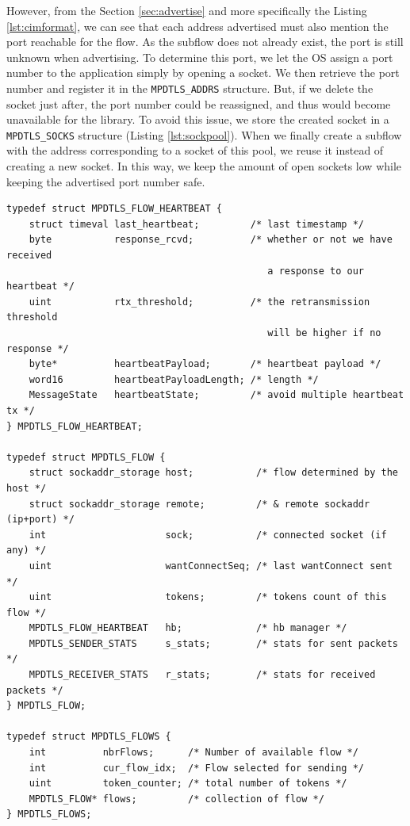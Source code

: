 However, from the Section \ref{sec:advertise} and more specifically the Listing \ref{lst:cimformat}, we can see that each address advertised must also mention the port reachable for the flow. As the subflow does not already exist, the port is still unknown when advertising. To determine this port, we let the OS assign a port number to the application simply by opening a socket. We then retrieve the port number and register it in the \texttt{MPDTLS\_ADDRS} structure. But, if we delete the socket just after, the port number could be reassigned, and thus would become unavailable for the library. To avoid this issue, we store the created socket in a \texttt{MPDTLS\_SOCKS} structure (Listing \ref{lst:sockpool}). When we finally create a subflow with the address corresponding to a socket of this pool, we reuse it instead of creating a new socket. In this way, we keep the amount of open sockets low while keeping the advertised port number safe.

\begin{lstlisting}[caption=Structures handling flows, label=lst:flow]
typedef struct MPDTLS_FLOW_HEARTBEAT {
    struct timeval last_heartbeat;         /* last timestamp */
    byte           response_rcvd;          /* whether or not we have received
                                              a response to our heartbeat */
    uint           rtx_threshold;          /* the retransmission threshold
                                              will be higher if no response */
    byte*          heartbeatPayload;       /* heartbeat payload */
    word16         heartbeatPayloadLength; /* length */
    MessageState   heartbeatState;         /* avoid multiple heartbeat tx */
} MPDTLS_FLOW_HEARTBEAT;

typedef struct MPDTLS_FLOW {
    struct sockaddr_storage host;           /* flow determined by the host */
    struct sockaddr_storage remote;         /* & remote sockaddr (ip+port) */
    int                     sock;           /* connected socket (if any) */
    uint                    wantConnectSeq; /* last wantConnect sent */
    uint                    tokens;         /* tokens count of this flow */
    MPDTLS_FLOW_HEARTBEAT   hb;             /* hb manager */
    MPDTLS_SENDER_STATS     s_stats;        /* stats for sent packets */
    MPDTLS_RECEIVER_STATS   r_stats;        /* stats for received packets */
} MPDTLS_FLOW;

typedef struct MPDTLS_FLOWS {
    int          nbrFlows;      /* Number of available flow */
    int          cur_flow_idx;  /* Flow selected for sending */
    uint         token_counter; /* total number of tokens */
    MPDTLS_FLOW* flows;         /* collection of flow */
} MPDTLS_FLOWS;
\end{lstlisting}

